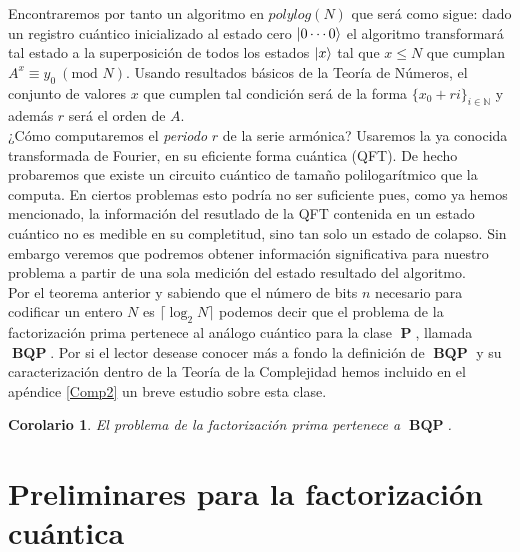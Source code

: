 \documentclass[11pt, spanish]{report}
\numberwithin{equation}{section}
\newtheorem{corol}[defin]{Corolario}
\numberwithin{defin}{section}
\DeclareMathOperator{\PP}{\mathbf{P}}
\DeclareMathOperator{\BQP}{\mathbf{BQP}}
\newenvironment{yellowBox}{\begin{tcolorbox}[colback=yellow!5!white,colframe=yellow!75!black]}{\end{tcolorbox}}
\begin{document}
Encontraremos por tanto un algoritmo en $polylog(N)$ que será como sigue: dado un registro cuántico inicializado al estado cero $\ket{0\cdots 0}$ el algoritmo transformará tal estado a la superposición de todos los estados $\ket{x}$ tal que $x\leq N$ que cumplan $A^x\equiv y_0\ (\text{mod } N)$. Usando resultados básicos de la Teoría de Números, el conjunto de valores $x$ que cumplen tal condición será de la forma $\{x_0+ri\}_{i \in \mathbb{N}}$ y además $r$ será el orden de $A$.\\

¿Cómo computaremos el \textit{periodo} $r$ de la serie armónica? Usaremos la ya conocida transformada de Fourier, en su eficiente forma cuántica (QFT). De hecho probaremos que existe un circuito cuántico de tamaño polilogarítmico que la computa. En ciertos problemas esto podría no ser suficiente pues, como ya hemos mencionado, la información del resutlado de la QFT contenida en un estado cuántico no es medible en su completitud, sino tan solo un estado de colapso. Sin embargo veremos que podremos obtener información significativa para nuestro problema a partir de una sola medición del estado resultado del algoritmo. \\


Por el teorema anterior y sabiendo que el número de bits $n$ necesario para codificar un entero $N$ es $\lceil \log_2 N\rceil$ podemos decir que el problema de la factorización prima pertenece al análogo cuántico para la clase $\PP$, llamada $\BQP$. Por si el lector desease conocer más a fondo la definición de $\BQP$ y su caracterización dentro de la Teoría de la Complejidad hemos incluido en el apéndice \ref{Comp2} un breve estudio sobre esta clase.\\

\begin{yellowBox}
\begin{corol} El problema de la factorización prima pertenece a $\BQP$.
\end{corol}
\end{yellowBox}

\section{Preliminares para la factorización cuántica} 
\end{document}

